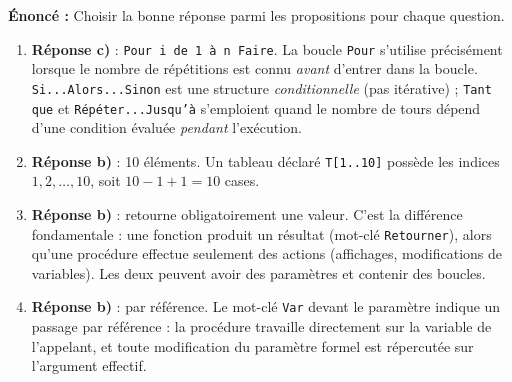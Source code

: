 \documentclass[11pt]{article}
\newcommand{\cle}[1]{{\popxbold\color{popdark}#1}}
\begin{document}
\begin{corrige}
\textbf{Énoncé :} Choisir la bonne réponse parmi les propositions pour chaque question.
\tcblower
\begin{enumerate}
  \item \textbf{Réponse c)} : \texttt{Pour i de 1 à n Faire}. La boucle \texttt{Pour} s'utilise précisément lorsque le nombre de répétitions est connu \emph{avant} d'entrer dans la boucle. \texttt{Si...Alors...Sinon} est une structure \emph{conditionnelle} (pas itérative) ; \texttt{Tant que} et \texttt{Répéter...Jusqu'à} s'emploient quand le nombre de tours dépend d'une condition évaluée \emph{pendant} l'exécution.
  \item \textbf{Réponse b)} : 10 éléments. Un tableau déclaré \texttt{T[1..10]} possède les indices $1, 2, \dots, 10$, soit $10 - 1 + 1 = 10$ cases.
  \item \textbf{Réponse b)} : retourne obligatoirement une valeur. C'est la différence fondamentale : une \cle{fonction} produit un résultat (mot-clé \texttt{Retourner}), alors qu'une \cle{procédure} effectue seulement des actions (affichages, modifications de variables). Les deux peuvent avoir des paramètres et contenir des boucles.
  \item \textbf{Réponse b)} : par référence. Le mot-clé \texttt{Var} devant le paramètre indique un \cle{passage par référence} : la procédure travaille directement sur la variable de l'appelant, et toute modification du paramètre formel est répercutée sur l'argument effectif.
\end{enumerate}
\end{corrige}
\end{document}
